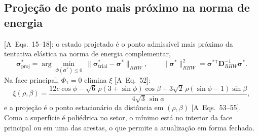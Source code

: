 \documentclass[11pt,a4paper]{article}
\numberwithin{equation}{section}
\newcommand{\sig}{\boldsymbol\sigma}
\newcommand{\sn}{\sin\phi}
\newcommand{\cs}{\cos\phi}
\newcommand{\art}[1]{{\footnotesize\textsf{[A~#1]}}}
\begin{document}
\subsection{Projeção de ponto mais próximo na norma de energia}
\art{Eqs.~15--18}: o estado projetado é o ponto admissível mais próximo da tentativa elástica na norma de energia
complementar,
\begin{equation}
\sig^*_{\mathrm{proj}}=\arg\min_{\Phi(\sig^*)\le0}\ \big\|\sig^*_{\mathrm{trial}}-\sig^*\big\|_{RHW},\qquad
\|\sig^*\|_{RHW}^2=\sig^{*\mathsf T}\mathbf D_{RHW}^{-1}\sig^*.
\end{equation}
Na face principal, $\Phi_1=0$ elimina $\xi$ \art{Eq.~52}:
\begin{equation}
\xi(\rho,\beta)=\frac{12c\cs-\sqrt6\,\rho(3+\sn)\cos\beta+3\sqrt2\,\rho(\sn-1)\sin\beta}{4\sqrt3\,\sn},
\end{equation}
e a projeção é o ponto estacionário da distância em $(\rho,\beta)$ \art{Eqs.~53--55}. Como a superfície é poliédrica no
setor, o mínimo está no interior da face principal ou em uma das arestas, o que permite a atualização em forma fechada.
\end{document}

